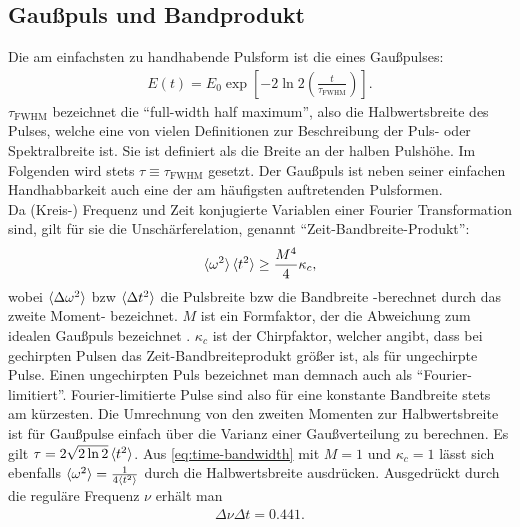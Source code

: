 \documentclass[twoside,        %
               BCOR12mm,       %
               english,ngerman, %
               fleqn,headsepline=false,footsepline=false
              ]{Vorlage/MFPREPORT}
\begin{document}
\subsection{Gaußpuls und Bandprodukt}
\label{seq:bandprod}
Die am einfachsten zu handhabende Pulsform ist die eines Gaußpulses:
\cite{Diels2006} 
\begin{align}
    E(t)=E_0\exp\left[-2\ln 2\left(\frac{t}{\tau_{\text{FWHM}}}\right)\right].
    \label{eq:gaus}
\end{align}
$\tau_{\text{FWHM}}$ bezeichnet die ``full-width half maximum'', also die Halbwertsbreite des Pulses, welche eine von vielen Definitionen zur Beschreibung der Puls- oder Spektralbreite ist. Sie ist definiert als die Breite an der halben Pulshöhe. Im Folgenden wird stets $\tau\equiv\tau_{\text{FWHM}}$ gesetzt. Der Gaußpuls ist neben seiner einfachen Handhabbarkeit auch eine der am häufigsten auftretenden Pulsformen.\\
Da (Kreis-) Frequenz und Zeit konjugierte Variablen einer Fourier
Transformation sind, gilt für sie die Unschärferelation, genannt
``Zeit-Bandbreite-Produkt'': \cite{Diels2006} 
\begin{align}
    \braket{\omega^{2}}\braket{t^{2}} \geq \frac{M^{4}}{4}\kappa_c,
    \label{eq:time-bandwidth}
\end{align}
wobei $\braket{\Delta\omega^{2}}$ bzw $\braket{\Delta t^{2}}$ die Pulsbreite
bzw die Bandbreite -berechnet durch das zweite Moment- bezeichnet. $M$ ist ein
Formfaktor, der die Abweichung zum idealen Gaußpuls bezeichnet \cite{Diels2006}. $\kappa_c$ ist der Chirpfaktor, welcher angibt, dass bei gechirpten Pulsen das Zeit-Bandbreiteprodukt größer ist, als für ungechirpte Pulse. Einen ungechirpten Puls bezeichnet man demnach auch als ``Fourier-limitiert''. Fourier-limitierte Pulse sind also für eine konstante Bandbreite stets am kürzesten.
Die Umrechnung von den zweiten Momenten zur Halbwertsbreite ist für Gaußpulse
einfach über die Varianz einer Gaußverteilung zu berechnen. Es gilt
$\tau=2\sqrt{2 \ln 2}\braket{t^2}$. Aus \cref{eq:time-bandwidth} mit $M=1$ und
$\kappa_c=1$ lässt sich ebenfalls $\braket{\omega^2}=\frac{1}{4 \braket{t^2}}$
durch die Halbwertsbreite ausdrücken. Ausgedrückt durch die reguläre Frequenz
$\nu$
erhält man
\begin{align}
    \label{eq:bandprodeasy}
    \Delta \nu \Delta t = 0.441.
\end{align}
\end{document}
